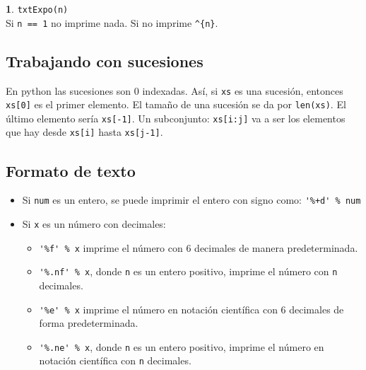 \documentclass[12pt]{article}
\theoremstyle{definition}
\newtheorem{funcion}{}[section]
\begin{document}
\begin{funcion}
  \verb|txtExpo(n)| \\[1ex]
  Si \verb|n == 1| no imprime nada. Si no imprime \verb|^{n}|.
\end{funcion}

\subsection{Trabajando con sucesiones}

En python las sucesiones son 0 indexadas. As\'i, si \verb|xs| es una sucesi\'on, entonces \verb|xs[0]| es el primer elemento. El tama\~no de una sucesi\'on se da por \verb|len(xs)|. El \'ultimo elemento ser\'ia \verb|xs[-1]|. Un subconjunto: \verb|xs[i:j]| va a ser los elementos que hay desde \verb|xs[i]| hasta \verb|xs[j-1]|.

\subsection{Formato de texto}

\begin{itemize}
  \item Si \verb|num| es un entero, se puede imprimir el entero con signo como: \verb|'%+d' % num|
  \item Si \verb|x| es un n\'umero con decimales:
    \begin{itemize}
      \item \verb|'%f' % x| imprime el n\'umero con 6 decimales de manera predeterminada.
      \item \verb|'%.nf' % x|, donde \verb|n| es un entero positivo, imprime el n\'umero con \verb|n| decimales.
      \item \verb|'%e' % x| imprime el n\'umero en notaci\'on cient\'ifica con 6 decimales de forma predeterminada.
      \item \verb|'%.ne' % x|, donde \verb|n| es un entero positivo, imprime el n\'umero en notaci\'on cient\'ifica con \verb|n| decimales.
    \end{itemize}
\end{itemize}
\end{document}
